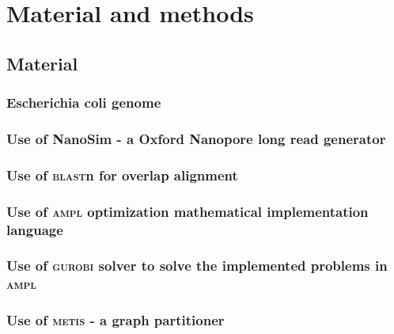 \chapter{Material and methods}

\section{Material}

\subsection{Escherichia coli genome}

\subsection{Use of NanoSim\cite{yang_nanosim:_2017} - a Oxford Nanopore long read generator}

\subsection{Use of \textsc{blast}n for overlap alignment}

\subsection{Use of \textsc{ampl}\cite{al-baali_ampl_2015} optimization mathematical implementation language}

\subsection{Use of \textsc{gurobi}\cite{rothberg_gurobi_nodate} solver to solve the implemented problems in \textsc{ampl}}

\subsection{Use of \textsc{metis}\cite{karypis_fast_1998} - a graph partitioner}

